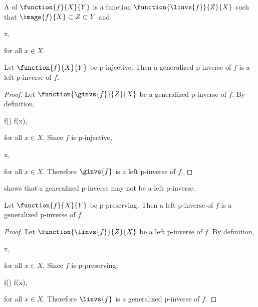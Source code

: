 \documentclass[b5paper, english, oneside]{memoir}
\begin{document}
\begin{definition}
A  of $\function{f}{X}{Y}$ is a function $\function{\linvs{f}}{Z}{X}$ such that $\image{f}{X} \subset Z \subset Y$ and
\begin{eqs}
 \preeq x,
\end{eqs}
for all $x \in X$.
\end{definition}

\begin{theorem}
\label{GeneralizedPInverseIsLeftPInverseForPInjective}
Let $\function{f}{X}{Y}$ be p-injective. Then a generalized p-inverse of $f$ is a left p-inverse of $f$.
\end{theorem}

\begin{proof}
Let $\function{\ginvs{f}}{Z}{X}$ be a generalized p-inverse of $f$. By definition,
\begin{eqs}
f() \preeqb f(x),
\end{eqs}
for all $x \in X$. Since $f$ is p-injective,
\begin{eqs}
 \preeq x,
\end{eqs}
for all $x \in X$. Therefore $\ginvs{f}$ is a left p-inverse of $f$.
\end{proof}

\begin{note}
 shows that a generalized p-inverse may not be a left p-inverse.
\end{note}

\begin{theorem}
\label{LeftPInverseIsGeneralizedPInverseForPPreserving}
Let $\function{f}{X}{Y}$ be p-preserving. Then a left p-inverse of $f$ is a generalized p-inverse of $f$.
\end{theorem}

\begin{proof}
Let $\function{\linvs{f}}{Z}{X}$ be a left p-inverse of $f$. By definition,
\begin{eqs}
 \preeq x,
\end{eqs}
for all $x \in X$. Since $f$ is p-preserving,
\begin{eqs}
f() \preeqb f(x),
\end{eqs}
for all $x \in X$. Therefore $\linvs{f}$ is a generalized p-inverse of $f$.
\end{proof}
\end{document}
